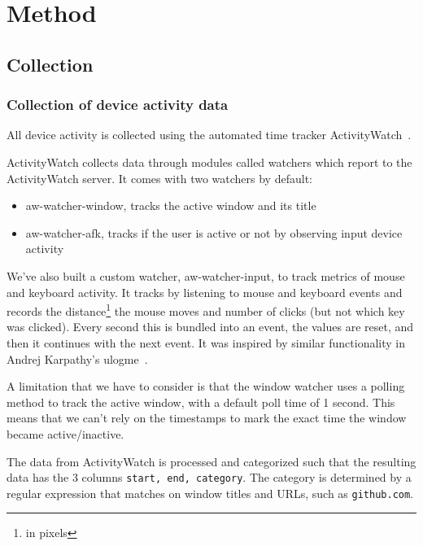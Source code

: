 \section{Method}

\subsection{Collection}

    \subsubsection{Collection of device activity data}

        All device activity is collected using the automated time tracker ActivityWatch~\cite{bjareholt_activitywatch_2020-1}.

        ActivityWatch collects data through modules called watchers which report to the ActivityWatch server. It comes with two watchers by default:

        \begin{itemize}
            \item aw-watcher-window, tracks the active window and its title
            \item aw-watcher-afk, tracks if the user is active or not by observing input device activity
        \end{itemize}

        We've also built a custom watcher, aw-watcher-input, to track metrics of mouse and keyboard activity. It tracks by listening to mouse and keyboard events and records the distance\footnote{in pixels} the mouse moves and number of clicks (but not which key was clicked). Every second this is bundled into an event, the values are reset, and then it continues with the next event. It was inspired by similar functionality in Andrej Karpathy's ulogme~\cite{karpathy_ulogme_2016}.

        A limitation that we have to consider is that the window watcher uses a polling method to track the active window, with a default poll time of 1 second. This means that we can't rely on the timestamps to mark the exact time the window became active/inactive.

        The data from ActivityWatch is processed and categorized such that the resulting data has the 3 columns \texttt{start, end, category}. The category is determined by a regular expression that matches on window titles and URLs, such as \texttt{github.com}.

